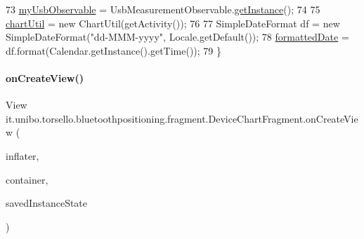 \begin{DoxyCode}
73         \hyperlink{classit_1_1unibo_1_1torsello_1_1bluetoothpositioning_1_1fragment_1_1DeviceChartFragment_aa9e0527dce7ccc3e51afe698a76f2faf_aa9e0527dce7ccc3e51afe698a76f2faf}{myUsbObservable} = UsbMeasurementObservable.\hyperlink{classit_1_1unibo_1_1torsello_1_1bluetoothpositioning_1_1observables_1_1UsbMeasurementObservable_aff4f89490f3f2c11ca4feea933d12d88_aff4f89490f3f2c11ca4feea933d12d88}{getInstance}();
74 
75         \hyperlink{classit_1_1unibo_1_1torsello_1_1bluetoothpositioning_1_1fragment_1_1DeviceChartFragment_ad28ad16d89e075ea2e572bba9b24bc4e_ad28ad16d89e075ea2e572bba9b24bc4e}{chartUtil} = \textcolor{keyword}{new} ChartUtil(getActivity());
76 
77         SimpleDateFormat df = \textcolor{keyword}{new} SimpleDateFormat(\textcolor{stringliteral}{"dd-MMM-yyyy"}, Locale.getDefault());
78         \hyperlink{classit_1_1unibo_1_1torsello_1_1bluetoothpositioning_1_1fragment_1_1DeviceChartFragment_a9a927b3e1271a11093f62a53d294f908_a9a927b3e1271a11093f62a53d294f908}{formattedDate} = df.format(Calendar.getInstance().getTime());
79     \}
\end{DoxyCode}
\hypertarget{classit_1_1unibo_1_1torsello_1_1bluetoothpositioning_1_1fragment_1_1DeviceChartFragment_ae4d8a0e874dc5cd856de7424bc9269f0_ae4d8a0e874dc5cd856de7424bc9269f0}{}\label{classit_1_1unibo_1_1torsello_1_1bluetoothpositioning_1_1fragment_1_1DeviceChartFragment_ae4d8a0e874dc5cd856de7424bc9269f0_ae4d8a0e874dc5cd856de7424bc9269f0} 
\paragraph{\texorpdfstring{on\+Create\+View()}{onCreateView()}}
{\footnotesize\ttfamily View it.\+unibo.\+torsello.\+bluetoothpositioning.\+fragment.\+Device\+Chart\+Fragment.\+on\+Create\+View (\begin{DoxyParamCaption}\item[{Layout\+Inflater}]{inflater,  }\item[{View\+Group}]{container,  }\item[{Bundle}]{saved\+Instance\+State }\end{DoxyParamCaption})}


